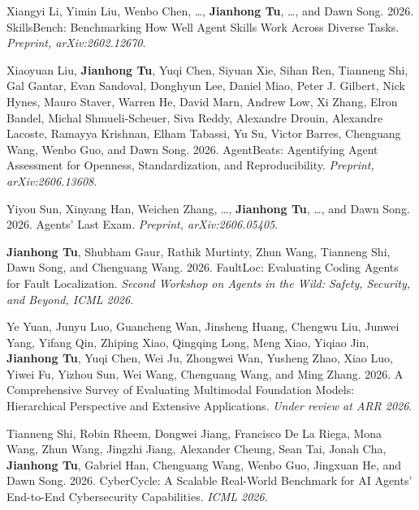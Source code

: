 \documentclass[10pt, letterpaper]{article}
\begin{document}
    \begin{enumerate}[leftmargin=1.5em, label={[\arabic*]}, itemsep=0.45em]

        \item Xiangyi Li, Yimin Liu, Wenbo Chen, \ldots, \textbf{Jianhong Tu}, \ldots, and Dawn Song. 2026. SkillsBench: Benchmarking How Well Agent Skills Work Across Diverse Tasks. \textit{Preprint, arXiv:2602.12670}.

        \item Xiaoyuan Liu, \textbf{Jianhong Tu}, Yuqi Chen, Siyuan Xie, Sihan Ren, Tianneng Shi, Gal Gantar, Evan Sandoval, Donghyun Lee, Daniel Miao, Peter J. Gilbert, Nick Hynes, Mauro Staver, Warren He, David Marn, Andrew Low, Xi Zhang, Elron Bandel, Michal Shmueli-Scheuer, Siva Reddy, Alexandre Drouin, Alexandre Lacoste, Ramayya Krishnan, Elham Tabassi, Yu Su, Victor Barres, Chenguang Wang, Wenbo Guo, and Dawn Song. 2026. AgentBeats: Agentifying Agent Assessment for Openness, Standardization, and Reproducibility. \textit{Preprint, arXiv:2606.13608}.

        \item Yiyou Sun, Xinyang Han, Weichen Zhang, \ldots, \textbf{Jianhong Tu}, \ldots, and Dawn Song. 2026. Agents' Last Exam. \textit{Preprint, arXiv:2606.05405}.

        \item \textbf{Jianhong Tu}, Shubham Gaur, Rathik Murtinty, Zhun Wang, Tianneng Shi, Dawn Song, and Chenguang Wang. 2026. FaultLoc: Evaluating Coding Agents for Fault Localization. \textit{Second Workshop on Agents in the Wild: Safety, Security, and Beyond, ICML 2026}.

        \item Ye Yuan, Junyu Luo, Guancheng Wan, Jinsheng Huang, Chengwu Liu, Junwei Yang, Yifang Qin, Zhiping Xiao, Qingqing Long, Meng Xiao, Yiqiao Jin, \textbf{Jianhong Tu}, Yuqi Chen, Wei Ju, Zhongwei Wan, Yusheng Zhao, Xiao Luo, Yiwei Fu, Yizhou Sun, Wei Wang, Chenguang Wang, and Ming Zhang. 2026. A Comprehensive Survey of Evaluating Multimodal Foundation Models: Hierarchical Perspective and Extensive Applications. \textit{Under review at ARR 2026}.

        \item Tianneng Shi, Robin Rheem, Dongwei Jiang, Francisco De La Riega, Mona Wang, Zhun Wang, Jingzhi Jiang, Alexander Cheung, Sean Tai, Jonah Cha, \textbf{Jianhong Tu}, Gabriel Han, Chenguang Wang, Wenbo Guo, Jingxuan He, and Dawn Song. 2026. CyberCycle: A Scalable Real-World Benchmark for AI Agents' End-to-End Cybersecurity Capabilities. \textit{ICML 2026}.


\end{enumerate}
\end{document}
